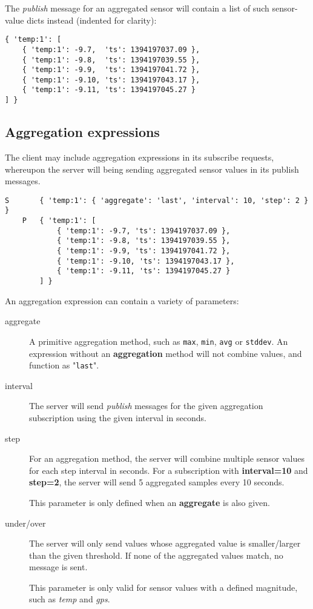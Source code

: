 \documentclass[a4paper]{article}
\begin{document}
The \emph{publish} message for an aggregated sensor will contain a list of such sensor-value dicts instead (indented for clarity):
\begin{verbatim}
{ 'temp:1': [
    { 'temp:1': -9.7,  'ts': 1394197037.09 },
    { 'temp:1': -9.8,  'ts': 1394197039.55 },
    { 'temp:1': -9.9,  'ts': 1394197041.72 },
    { 'temp:1': -9.10, 'ts': 1394197043.17 },
    { 'temp:1': -9.11, 'ts': 1394197045.27 }
] }
\end{verbatim}

\subsection{Aggregation expressions}

The client may include aggregation expressions in its subscribe requests, whereupon the server will being sending aggregated sensor values in its publish messages.

\begin{verbatim}
S       { 'temp:1': { 'aggregate': 'last', 'interval': 10, 'step': 2 } }
    P   { 'temp:1': [
            { 'temp:1': -9.7, 'ts': 1394197037.09 },
            { 'temp:1': -9.8, 'ts': 1394197039.55 },
            { 'temp:1': -9.9, 'ts': 1394197041.72 },
            { 'temp:1': -9.10, 'ts': 1394197043.17 },
            { 'temp:1': -9.11, 'ts': 1394197045.27 }
        ] }
\end{verbatim}

An aggregation expression can contain a variety of parameters:

\begin{description}
	\item[aggregate]
		A primitive aggregation method, such as \texttt{max}, \texttt{min}, \texttt{avg} or \texttt{stddev}. 
		An expression without an \textbf{aggregation} method will not combine values, and function as "\texttt{last}".
		
	\item[interval]
		The server will send \emph{publish} messages for the given aggregation subscription using the given interval in seconds.
		
	\item[step]
		For an aggregation method, the server will combine multiple sensor values for each step interval in seconds.
		For a subscription with \textbf{interval=10} and \textbf{step=2}, the server will send 5 aggregated samples every 10 seconds.
		
		This parameter is only defined when an \textbf{aggregate} is also given.

	\item[under/over]
		The server will only send values whose aggregated value is smaller/larger than the given threshold.	
		If none of the aggregated values match, no message is sent.
		
		This parameter is only valid for sensor values with a defined magnitude, such as \textit{temp} and \textit{gps}.	
\end{description}
\end{document}
